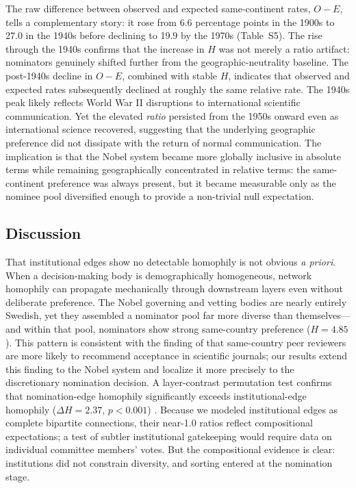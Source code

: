 \documentclass[12pt]{article}
\begin{document}
The raw difference between observed and expected same-continent rates, $O - E$, tells a complementary story: it rose from 6.6 percentage points in the 1900s to 27.0 in the 1940s before declining to 19.9 by the 1970s (Table~S5). The rise through the 1940s confirms that the increase in $H$ was not merely a ratio artifact: nominators genuinely shifted further from the geographic-neutrality baseline. The post-1940s decline in $O - E$, combined with stable $H$, indicates that observed and expected rates subsequently declined at roughly the same relative rate. The 1940s peak likely reflects World War II disruptions to international scientific communication. Yet the elevated \emph{ratio} persisted from the 1950s onward even as international science recovered, suggesting that the underlying geographic preference did not dissipate with the return of normal communication. The implication is that the Nobel system became more globally inclusive in absolute terms while remaining geographically concentrated in relative terms: the same-continent preference was always present, but it became measurable only as the nominee pool diversified enough to provide a non-trivial null expectation.

\subsection*{Discussion}

That institutional edges show no detectable homophily is not obvious \textit{a priori}. When a decision-making body is demographically homogeneous, network homophily can propagate mechanically through downstream layers even without deliberate preference. The Nobel governing and vetting bodies are nearly entirely Swedish, yet they assembled a nominator pool far more diverse than themselves---and within that pool, nominators show strong same-country preference ($H = 4.85$). This pattern is consistent with the finding of \cite{ZumTep2025} that same-country peer reviewers are more likely to recommend acceptance in scientific journals; our results extend this finding to the Nobel system and localize it more precisely to the discretionary nomination decision. A layer-contrast permutation test confirms that nomination-edge homophily significantly exceeds institutional-edge homophily ($\Delta H = 2.37$, $p < 0.001$) \cite{methods}. Because we modeled institutional edges as complete bipartite connections, their near-1.0 ratios reflect compositional expectations; a test of subtler institutional gatekeeping would require data on individual committee members' votes. But the compositional evidence is clear: institutions did not constrain diversity, and sorting entered at the nomination stage.
\end{document}
